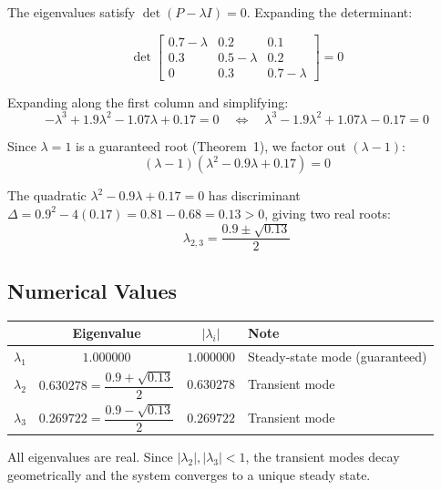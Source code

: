 \documentclass[12pt, a4paper]{article}
\begin{document}
The eigenvalues satisfy $\det(P - \lambda I) = 0$. Expanding the determinant:

\begin{equation}
  \det
  \begin{bmatrix}
    0.7-\lambda & 0.2           & 0.1 \\
    0.3         & 0.5-\lambda   & 0.2 \\
    0           & 0.3           & 0.7-\lambda
  \end{bmatrix} = 0
\end{equation}

Expanding along the first column and simplifying:
\begin{equation}
  -\lambda^3 + 1.9\lambda^2 - 1.07\lambda + 0.17 = 0
  \quad\Longleftrightarrow\quad
  \lambda^3 - 1.9\lambda^2 + 1.07\lambda - 0.17 = 0
\end{equation}

Since $\lambda = 1$ is a guaranteed root (Theorem~1), we factor out $(\lambda - 1)$:
\begin{equation}
  (\lambda - 1)\!\left(\lambda^2 - 0.9\lambda + 0.17\right) = 0
\end{equation}

The quadratic $\lambda^2 - 0.9\lambda + 0.17 = 0$ has discriminant
$\Delta = 0.9^2 - 4(0.17) = 0.81 - 0.68 = 0.13 > 0$, giving two real roots:
\begin{equation}
  \lambda_{2,3} = \frac{0.9 \pm \sqrt{0.13}}{2}
\end{equation}

\subsection*{Numerical Values}

\begin{center}
\begin{tabular}{cccl}
\toprule
& \textbf{Eigenvalue} & $|\lambda_i|$ & \textbf{Note} \\
\midrule
$\lambda_1$ & $1.000000$ & $1.000000$ & Steady-state mode (guaranteed) \\
$\lambda_2$ & $0.630278 = \dfrac{0.9+\sqrt{0.13}}{2}$ & $0.630278$ & Transient mode \\[6pt]
$\lambda_3$ & $0.269722 = \dfrac{0.9-\sqrt{0.13}}{2}$ & $0.269722$ & Transient mode \\
\bottomrule
\end{tabular}
\end{center}

All eigenvalues are real.  Since $|\lambda_2|, |\lambda_3| < 1$, the transient modes
decay geometrically and the system converges to a unique steady state.
\end{document}

